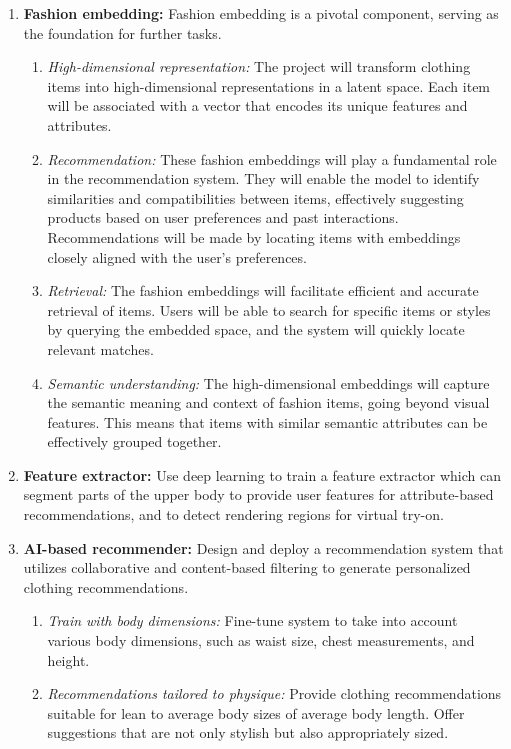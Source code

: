 	\begin{enumerate}
		\item \textbf{Fashion embedding:} Fashion embedding is a pivotal component, serving as the foundation for further tasks.
			\begin{enumerate}
				\item \textit{High-dimensional representation:} The project will transform clothing items into high-dimensional representations in a latent space. Each item will be associated with a vector that encodes its unique features and attributes.
				\item \textit{Recommendation:} These fashion embeddings will play a fundamental role in the recommendation system. They will enable the model to identify similarities and compatibilities between items, effectively suggesting products based on user preferences and past interactions. Recommendations will be made by locating items with embeddings closely aligned with the user's preferences.
				\item \textit{Retrieval:} The fashion embeddings will facilitate efficient and accurate retrieval of items. Users will be able to search for specific items or styles by querying the embedded space, and the system will quickly locate relevant matches.
				\item \textit{Semantic understanding:} The high-dimensional embeddings will capture the semantic meaning and context of fashion items, going beyond visual features. This means that items with similar semantic attributes can be effectively grouped together.
			\end{enumerate}
		\item \textbf{Feature extractor:} Use deep learning to train a feature extractor which can segment parts of the upper body to provide user features for attribute-based recommendations, and to detect rendering regions for virtual try-on.
		\item \textbf{AI-based recommender:} Design and deploy a recommendation system that utilizes collaborative and content-based filtering to generate personalized clothing recommendations.
			\begin{enumerate}
				\item \textit{Train with body dimensions:} Fine-tune system to take into account various body dimensions, such as waist size, chest measurements, and height.
				\item \textit{Recommendations tailored to physique:} Provide clothing recommendations suitable for lean to average body sizes of average body length. Offer suggestions that are not only stylish but also appropriately sized.

\end{enumerate}
\end{enumerate}
